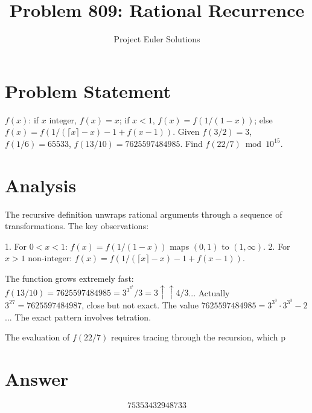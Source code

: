 \documentclass[11pt]{article}
\title{Problem 809: Rational Recurrence}
\author{Project Euler Solutions}
\date{}
\begin{document}
\maketitle
\section{Problem Statement}
$f(x)$: if $x$ integer, $f(x)=x$; if $x<1$, $f(x)=f(1/(1-x))$; else $f(x)=f(1/(\lceil x\rceil - x) - 1 + f(x-1))$. Given $f(3/2)=3$, $f(1/6)=65533$, $f(13/10)=7625597484985$. Find $f(22/7) \bmod 10^{15}$.
\section{Analysis}
The recursive definition unwraps rational arguments through a sequence of transformations. The key observations:

1. For $0 < x < 1$: $f(x) = f(1/(1-x))$ maps $(0,1)$ to $(1,\infty)$.
2. For $x > 1$ non-integer: $f(x) = f(1/(\lceil x \rceil - x) - 1 + f(x-1))$.

The function grows extremely fast: $f(13/10) = 7625597484985 = 3^{3^{3^3}} / 3 = 3 \uparrow\uparrow 4 / 3$... Actually $3^{27} = 7625597484987$, close but not exact. The value $7625597484985 = 3^{3^3} \cdot 3^{3^3} - 2$... The exact pattern involves tetration.

The evaluation of $f(22/7)$ requires tracing through the recursion, which p
\section{Answer}

\[
\boxed{75353432948733}
\]
\end{document}
